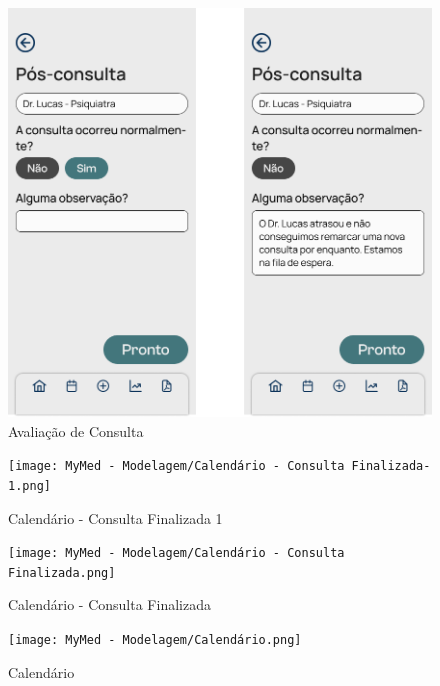 \begin{figure}
	\centering
	\includegraphics[width=1.0\linewidth]{MyMed - Modelagem/Avaliação Consulta.png}
	\caption{Avaliação de Consulta}
	\label{avaliacao_consulta}
\end{figure}

\begin{figure}
	\centering
	\texttt{[image: MyMed - Modelagem/Calendário - Consulta Finalizada-1.png]}
	\caption{Calendário - Consulta Finalizada 1}
	\label{calendario_consulta_finalizada_1}
\end{figure}

\begin{figure}
	\centering
	\texttt{[image: MyMed - Modelagem/Calendário - Consulta Finalizada.png]}
	\caption{Calendário - Consulta Finalizada}
	\label{calendario_consulta_finalizada}
\end{figure}

\begin{figure}
	\centering
	\texttt{[image: MyMed - Modelagem/Calendário.png]}
	\caption{Calendário}
	\label{calendario}
\end{figure}

